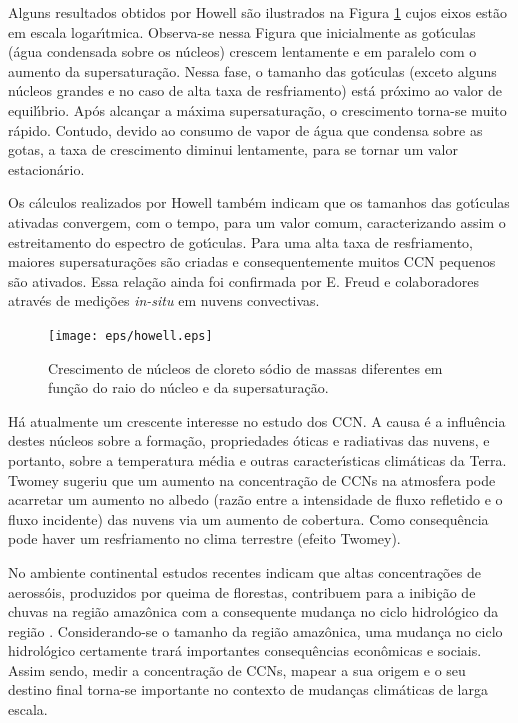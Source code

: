 Alguns resultados obtidos por Howell s\~{a}o ilustrados na Figura \ref{howell} cujos eixos est\~{a}o em escala logar\'{\i}tmica. Observa-se nessa Figura que inicialmente as got\'{\i}culas (\'{a}gua condensada sobre os n\'{u}cleos) crescem lentamente e em paralelo com o aumento da supersatura\c{c}\~{a}o. Nessa fase, o tamanho das got\'{\i}culas (exceto alguns n\'{u}cleos grandes e no caso de alta taxa de resfriamento) est\'{a} pr\'{o}ximo ao valor de equil\'{\i}brio. Ap\'{o}s alcan\c{c}ar a m\'{a}xima supersatura\c{c}\~{a}o, o crescimento torna-se muito r\'{a}pido. Contudo, devido ao consumo de vapor de \'{a}gua que condensa sobre as gotas, a taxa de crescimento diminui lentamente, para se tornar um valor estacion\'{a}rio.

Os c\'{a}lculos realizados por Howell tamb\'{e}m indicam que os tamanhos das got\'{\i}culas ativadas convergem, com o tempo, para um valor comum, caracterizando assim o estreitamento do espectro de got\'{\i}culas. Para uma alta taxa de resfriamento, maiores supersatura\c{c}\~{o}es s\~{a}o criadas e consequentemente muitos CCN pequenos s\~{a}o ativados.
Essa rela\c{c}\~{a}o ainda foi confirmada por E. Freud e colaboradores \cite{freud} atrav\'{e}s de medi\c{c}\~{o}es \textit{in-situ} em nuvens convectivas.

\begin{figure}[!hbt]
\begin{center}
\texttt{[image: eps/howell.eps]}\\
\end{center}
\caption{\label{howell}\hspace{-0.1em} Crescimento de n\'{u}cleos de cloreto s\'{o}dio de massas diferentes em fun\c{c}\~{a}o do raio do n\'{u}cleo e da supersatura\c{c}\~{a}o.}
\end{figure}


H\'{a} atualmente um crescente interesse no estudo dos CCN. A causa \'{e} a influ\^{e}ncia destes n\'{u}cleos sobre a forma\c{c}\~{a}o, propriedades \'{o}ticas e radiativas das nuvens, e portanto, sobre a temperatura m\'{e}dia e outras caracter\'{\i}sticas clim\'{a}ticas da Terra. Twomey \cite{Twomey3} sugeriu que um aumento na concentra\c{c}\~{a}o de CCNs na atmosfera pode acarretar um aumento no albedo (raz\~{a}o entre a intensidade de fluxo refletido e o fluxo incidente) das nuvens via um aumento de cobertura. Como consequ\^{e}ncia pode haver um resfriamento no clima terrestre (efeito Twomey).

No ambiente continental estudos recentes indicam que altas concentra\c{c}\~{o}es de aeross\'{o}is, produzidos por queima de florestas, contribuem para a inibi\c{c}\~{a}o de chuvas na regi\~{a}o amaz\^{o}nica com a consequente mudan\c{c}a no ciclo hidrol\'{o}gico da regi\~{a}o \cite{Andreae,Debry}. Considerando-se o tamanho da regi\~{a}o amaz\^{o}nica, uma mudan\c{c}a no ciclo hidrol\'{o}gico certamente trar\'{a} importantes consequ\^{e}ncias econ\^{o}micas e sociais. Assim sendo, medir a concentra\c{c}\~{a}o de CCNs, mapear a sua origem e o seu destino final torna-se importante no contexto de mudan\c{c}as clim\'{a}ticas de larga escala.








